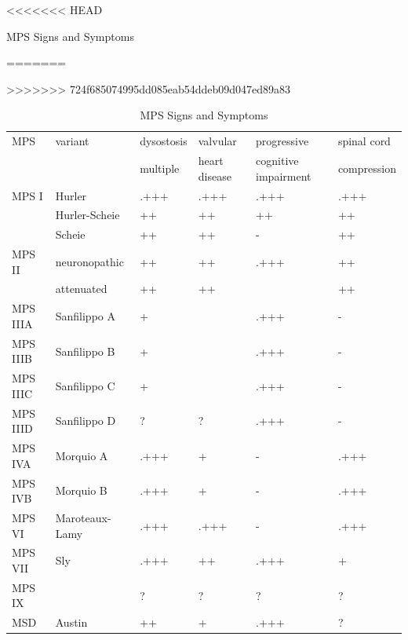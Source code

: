 \documentclass[fontsize=12pt]{scrartcl}
\begin{document}
\begin{enumerate}
\begin{enumerate}
\begin{enumerate}
\begin{enumerate}
\begin{table}[htbp]
\begin{enumerate}
\begin{enumerate}
\begin{enumerate}
\begin{enumerate}
\begin{enumerate}
\begin{enumerate}
\begin{table}[htbp]
<<<<<<< HEAD
\caption{\label{tab:orgb2d7682}MPS Signs and Symptoms}
=======
\caption{\label{tab:orge9c9e65}
MPS Signs and Symptoms}
>>>>>>> 724f685074995dd085eab54ddeb09d047ed89a83
\centering
\begin{tabular}{llllll}
MPS & variant & dysostosis & valvular & progressive & spinal cord\\
 &  & multiple & heart disease & cognitive impairment & compression\\
\hline
MPS I & Hurler & .+++ & .+++ & .+++ & .+++\\
 & Hurler-Scheie & ++ & ++ & ++ & ++\\
 & Scheie & ++ & ++ & - & ++\\
\hline
MPS II & neuronopathic & ++ & ++ & .+++ & ++\\
 & attenuated & ++ & ++ & \textpm{} & ++\\
\hline
MPS IIIA & Sanfilippo A & + & \textpm{} & .+++ & -\\
MPS IIIB & Sanfilippo B & + & \textpm{} & .+++ & -\\
MPS IIIC & Sanfilippo C & + & \textpm{} & .+++ & -\\
MPS IIID & Sanfilippo D & ? & ? & .+++ & -\\
\hline
MPS IVA & Morquio A & .+++ & + & - & .+++\\
MPS IVB & Morquio B & .+++ & + & - & .+++\\
\hline
MPS VI & Maroteaux-Lamy & .+++ & .+++ & - & .+++\\
MPS VII & Sly & .+++ & ++ & .+++ & +\\
MPS IX &  & ? & ? & ? & ?\\
MSD & Austin & ++ & + & .+++ & ?\\
\end{tabular}
\end{table}
\end{enumerate}


\end{enumerate}
\end{enumerate}
\end{enumerate}
\end{enumerate}
\end{enumerate}
\end{table}
\end{enumerate}
\end{enumerate}
\end{enumerate}
\end{enumerate}
\end{document}
